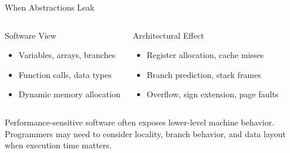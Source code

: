 \documentclass[aspectratio=169,11pt,t]{beamer}
\begin{document}
\begin{frame}{When Abstractions Leak}

\begin{columns}[T,onlytextwidth]


\begin{block}{Software View}
\begin{itemize}
  \item Variables, arrays, branches
  \item Function calls, data types
  \item Dynamic memory allocation
\end{itemize}
\end{block}


\begin{block}{Architectural Effect}
\begin{itemize}
  \item Register allocation, cache misses
  \item Branch prediction, stack frames
  \item Overflow, sign extension, page faults
\end{itemize}
\end{block}

\end{columns}

\vfill

Performance-sensitive software often exposes lower-level machine behavior. Programmers may need to consider locality, branch behavior, and data layout when execution time matters.

\end{frame}





\end{document}

